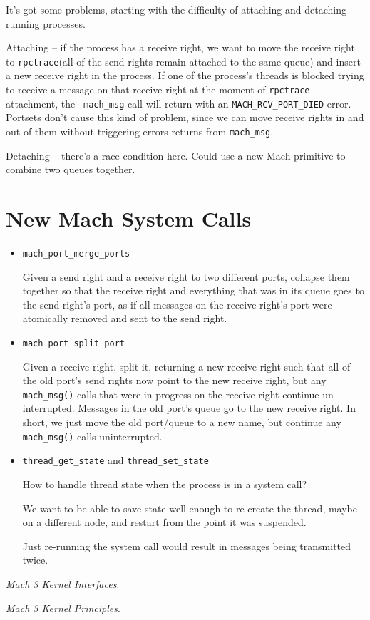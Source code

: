 \documentclass{article}
\def\rpctrace{{\tt rpctrace}\xspace}
\begin{document}
It's got some problems, starting with the difficulty of attaching
and detaching running processes.

Attaching -- if the process has a receive right, we want to move the
receive right to \rpctrace (all of the send rights remain attached to
the same queue) and insert a new receive right in the process.  If one
of the process's threads is blocked trying to receive a message on
that receive right at the moment of \rpctrace attachment, the {\tt
  mach_msg} call will return with an {\tt MACH_RCV_PORT_DIED} error.
Portsets don't cause this kind of problem, since we can move receive
rights in and out of them without triggering errors returns from
{\tt mach_msg}.

Detaching -- there's a race condition here.  Could use a new Mach
primitive to combine two queues together.


\section{New Mach System Calls}

\begin{itemize}

\item {\tt mach_port_merge_ports}

Given a send right and a receive right to two different ports, collapse
them together so that the receive right and everything that was in its
queue goes to the send right's port, as if all messages on the receive
right's port were atomically removed and sent to the send right.

\item {\tt mach_port_split_port}

Given a receive right, split it, returning a new receive right such
that all of the old port's send rights now point to the new receive
right, but any {\tt mach_msg()} calls that were in progress on the
receive right continue un-interrupted.  Messages in the old port's
queue go to the new receive right.  In short, we just move the old
port/queue to a new name, but continue any {\tt mach_msg()} calls
uninterrupted.

\item {\tt thread_get_state} and {\tt thread_set_state}

How to handle thread state when the process is in a system call?

We want to be able to save state well enough to re-create the
thread, maybe on a different node, and restart from the point
it was suspended.

Just re-running the system call would result in messages being
transmitted twice.

\end{itemize}


\begin{thebibliography}{9}

 {\it Mach 3 Kernel Interfaces}.

 {\it Mach 3 Kernel Principles}.

\end{thebibliography}
\end{document}
